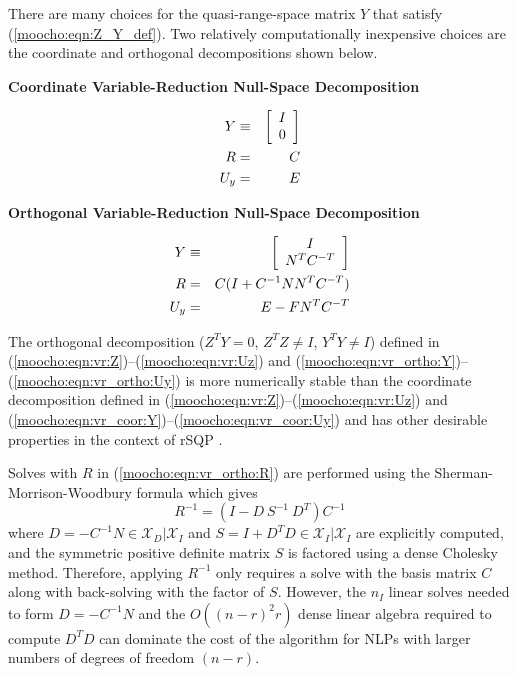 \documentclass[pdf,12pt,report]{SANDreport}
\begin{document}
There are many choices for the quasi-range-space matrix $Y$ that
satisfy (\ref{moocho:eqn:Z_Y_def}).  Two relatively computationally
inexpensive choices are the coordinate and orthogonal decompositions
shown below.

{\bsinglespace
\begin{center}\textbf{Coordinate Variable-Reduction Null-Space Decomposition}\end{center}
\begin{eqnarray}
Y & \equiv & {\bmat{c} I \\ 0 \emat}    \label{moocho:eqn:vr_coor:Y} \\
R & = & C                               \label{moocho:eqn:vr_coor:R} \\
U_y & = & E                             \label{moocho:eqn:vr_coor:Uy}
\end{eqnarray}

\begin{center}\textbf{Orthogonal Variable-Reduction Null-Space Decomposition}\end{center}
\begin{eqnarray}
Y & \equiv & {\bmat{c} I \\ N^T C^{-T} \emat}       \label{moocho:eqn:vr_ortho:Y} \\
R & = & C (I + C^{-1 }N N^T C^{-T})                 \label{moocho:eqn:vr_ortho:R} \\
U_y & = & E - F N^T C^{-T}                          \label{moocho:eqn:vr_ortho:Uy}
\end{eqnarray}
\esinglespace}

The orthogonal decomposition ($Z^T Y = 0$, $Z^T Z \neq I$, $Y^T Y \neq I$)
defined in (\ref{moocho:eqn:vr:Z})--(\ref{moocho:eqn:vr:Uz}) and
(\ref{moocho:eqn:vr_ortho:Y})--(\ref{moocho:eqn:vr_ortho:Uy}) is more
numerically stable than the coordinate decomposition defined in
(\ref{moocho:eqn:vr:Z})--(\ref{moocho:eqn:vr:Uz}) and
(\ref{moocho:eqn:vr_coor:Y})--(\ref{moocho:eqn:vr_coor:Uy}) and has other
desirable properties in the context of rSQP {}\cite{ref:schmid_accel_1993}.

Solves with $R$ in (\ref{moocho:eqn:vr_ortho:R}) are performed using the
Sherman-Morrison-Woodbury formula {}\cite{JNocedal_SJWright_1999} which gives
%
\begin{equation}
R^{-1} = ( I - D \: S^{-1} \: D^T ) C^{-1}
\label{moocho:eqn:vr_ortho:R:SMW}
\end{equation}
%
where $D = -C^{-1} N {}\in\mathcal{X}_D|\mathcal{X}_I$ and $S = I + D^T D
{}\in\mathcal{X}_I|\mathcal{X}_I$ are explicitly computed, and the symmetric
positive definite matrix $S$ is factored using a dense Cholesky method.
Therefore, applying $R^{-1}$ only requires a solve with the basis matrix $C$
along with back-solving with the factor of $S$.  However, the $n_I$ linear
solves needed to form $D = -C^{-1} N$ and the $O((n-r)^2 r)$ dense linear
algebra required to compute $D^T D$ can dominate the cost of the algorithm for
NLPs with larger numbers of degrees of freedom $(n-r)$.
\end{document}
